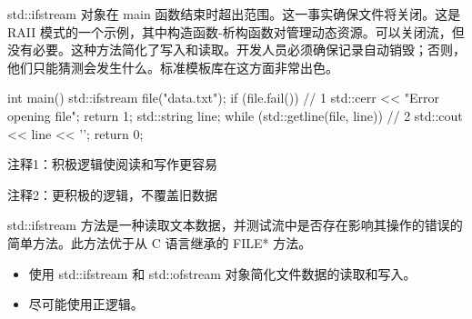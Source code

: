 std::ifstream 对象在 main 函数结束时超出范围。这一事实确保文件将关闭。这是 RAII 模式的一个示例，其中构造函数-析构函数对管理动态资源。可以关闭流，但没有必要。这种方法简化了写入和读取。开发人员必须确保记录自动销毁；否则，他们只能猜测会发生什么。标准模板库在这方面非常出色。


\begin{cpp}
int main() {
  std::ifstream file("data.txt");
  if (file.fail()) { // 1
    std::cerr << "Error opening file\n";
    return 1;
  }
  std::string line;
  while (std::getline(file, line)) // 2
  std::cout << line << '\n';
  return 0;
}
\end{cpp}

{\footnotesize
注释1：积极逻辑使阅读和写作更容易

注释2：更积极的逻辑，不覆盖旧数据
}

std::ifstream 方法是一种读取文本数据，并测试流中是否存在影响其操作的错误的简单方法。此方法优于从 C 语言继承的 FILE* 方法。


\begin{itemize}
\item
使用 std::ifstream 和 std::ofstream 对象简化文件数据的读取和写入。

\item
尽可能使用正逻辑。
\end{itemize}


































